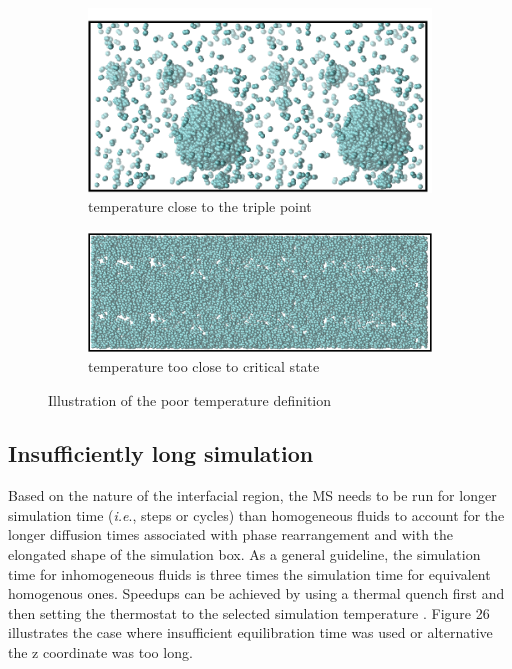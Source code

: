 \documentclass[9pt,bestpractices]{livecoms}
\begin{document}
\begin{figure}
	\centering
	\begin{subfigure}{0.2\textwidth} %
    \includegraphics[width=1\textwidth]{gfx/image75.png}
    \caption{temperature close to the triple point}
	\end{subfigure}
	\begin{subfigure}{0.2\textwidth} %
    \includegraphics[width=1\textwidth]{gfx/image76.png}
    \caption{temperature too close to critical state}
	\end{subfigure}
\caption{Illustration of the poor temperature definition}
\label{fig:25}
\end{figure}

\subsection{Insufficiently long simulation} 

Based on the nature of the interfacial region, the MS needs to be run for
longer simulation time (\textit{i.e}., steps or cycles) than homogeneous fluids
to account for the longer diffusion times associated with phase rearrangement
and with the elongated shape of the simulation box. As a general guideline, the
simulation time for inhomogeneous fluids is three times the simulation time for
equivalent homogenous ones. Speedups can be achieved by using a thermal quench
first and then setting the thermostat to the selected simulation temperature
\citep{gelb2002}. Figure 26 illustrates the case where insufficient equilibration time was
used or alternative the z coordinate was too long.
\end{document}
